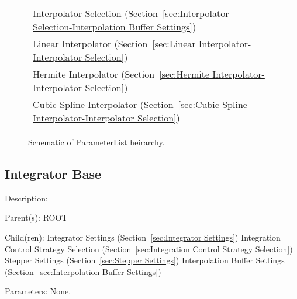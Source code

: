 \begin{figure}
\begin{tabular}{p{}}
\hspace*{0.4in} Interpolator Selection (Section~\ref{sec:Interpolator Selection-Interpolation Buffer Settings})
    \index{Interpolator Selection} \\ 
\hspace*{0.6in} Linear Interpolator (Section~\ref{sec:Linear Interpolator-Interpolator Selection})
    \index{Linear Interpolator} \\ 
\hspace*{0.6in} Hermite Interpolator (Section~\ref{sec:Hermite Interpolator-Interpolator Selection})
    \index{Hermite Interpolator} \\ 
\hspace*{0.6in} Cubic Spline Interpolator (Section~\ref{sec:Cubic Spline Interpolator-Interpolator Selection})
    \index{Cubic Spline Interpolator} \\ 
  \end{tabular}
\caption{Schematic of ParameterList heirarchy.} 
\label{fig:ParameterList-schematic} 
\end{figure} 
\newpage 

\subsection{Integrator Base}
\label{sec:Integrator Base}

\begin{list}{}
  {\setlength{\leftmargin}{1.0in}
   \setlength{\labelwidth}{0.75in}
   \setlength{\labelsep}{0.125in}}
  \item[Description:]
  \item[Parent(s):]
   ROOT 
  \item[Child(ren):]
    Integrator Settings (Section~\ref{sec:Integrator Settings})
      \newline 
    Integration Control Strategy Selection (Section~\ref{sec:Integration Control Strategy Selection})
      \newline 
    Stepper Settings (Section~\ref{sec:Stepper Settings})
      \newline 
    Interpolation Buffer Settings (Section~\ref{sec:Interpolation Buffer Settings})
  \item[Parameters:]
    None. 
\end{list}

